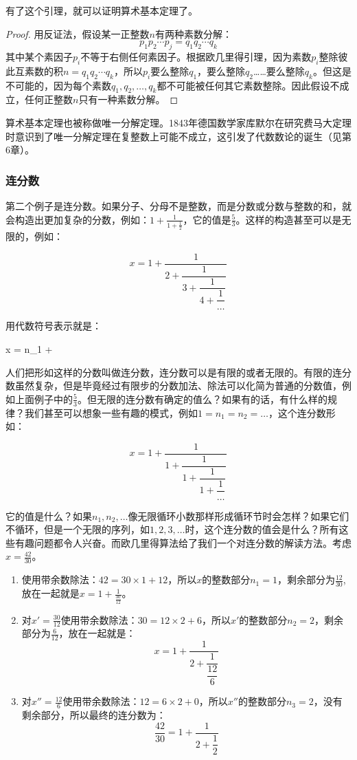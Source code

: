 \documentclass[b5paper]{ctexart}
\begin{document}
有了这个引理，就可以证明算术基本定理了。

\begin{proof}
用反证法，假设某一正整数$n$有两种素数分解：
\[
p_1 p_2 \dotsm p_j = q_1 q_2 \dotsm q_k
\]
其中某个素因子$p_i$不等于右侧任何素因子。根据欧几里得引理，因为素数$p_i$整除彼此互素数的积$n = q_1 q_2 \dotsm q_k$，所以$p_i$要么整除$q_1$，要么整除$q_2$……要么整除$q_k$。但这是不可能的，因为每个素数$q_1, q_2, \dotsc, q_k$都不可能被任何其它素数整除。因此假设不成立，任何正整数$n$只有一种素数分解。
\end{proof}

算术基本定理也被称做唯一分解定理。1843年德国数学家库默尔在研究费马大定理时意识到了唯一分解定理在复整数上可能不成立，这引发了代数数论的诞生（见第6章）。

\subsubsection{连分数}

第二个例子是连分数。如果分子、分母不是整数，而是分数或分数与整数的和，就会构造出更加复杂的分数，例如：$1 + \frac{1}{1 + \frac{1}{2}}$，它的值是$\frac{5}{3}$。这样的构造甚至可以是无限的，例如：

\[
x = 1 + \dfrac{1}{2 + \dfrac{1}{3 + \dfrac{1}{4 + \dfrac{1}{\dotso}}}}
\]

用代数符号表示就是：

\be
x = n_1 + 
\ee

人们把形如这样的分数叫做连分数，连分数可以是有限的或者无限的。有限的连分数虽然复杂，但是毕竟经过有限步的分数加法、除法可以化简为普通的分数值，例如上面例子中的$\frac{5}{3}$。但无限的连分数有确定的值么？如果有的话，有什么样的规律？我们甚至可以想象一些有趣的模式，例如$1 = n_1 = n_2 = \dotso $，这个连分数形如：

\[
x = 1 + \dfrac{1}{1 + \dfrac{1}{1 + \dfrac{1}{1 + \dfrac{1}{\dotso}}}}
\]

它的值是什么？如果$n_1, n_2, \dotsc$像无限循环小数那样形成循环节时会怎样？如果它们不循环，但是一个无限的序列，如$1, 2, 3, \dotso$时，这个连分数的值会是什么？所有这些有趣问题都令人兴奋。而欧几里得算法给了我们一个对连分数的解读方法。考虑$x = \frac{42}{30}$。

\begin{enumerate}[第1步，]
\item 使用带余数除法：$42 = 30 \times 1 + 12$，所以$x$的整数部分$n_1 = 1$，剩余部分为$\frac{12}{30}$, 放在一起就是$x = 1 + \frac{1}{\frac{30}{12}}$。
\item 对$x' = \frac{30}{12}$使用带余数除法：$30 = 12 \times 2 + 6$，所以$x'$的整数部分$n_2 = 2$，剩余部分为$\frac{6}{12}$，放在一起就是：
\[
x = 1 + \dfrac{1}{2 + \dfrac{1}{\dfrac{12}{6}}}
\]
\item 对$x'' = \frac{12}{6}$使用带余数除法：$12 = 6 \times 2 + 0$，所以$x''$的整数部分$n_3 = 2$，没有剩余部分，所以最终的连分数为：
\[
\dfrac{42}{30} = 1 + \dfrac{1}{2 + \dfrac{1}{2}}
\]
\end{enumerate}
\end{document}

